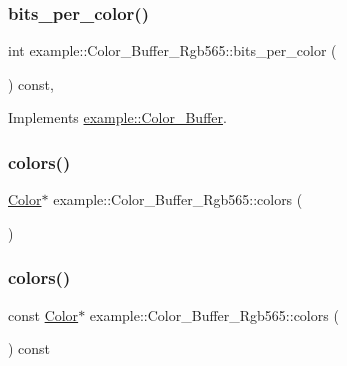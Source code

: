 \subsubsection{\texorpdfstring{bits\_per\_color()}{bits\_per\_color()}}
{\footnotesize\ttfamily int example\+::\+Color\+\_\+\+Buffer\+\_\+\+Rgb565\+::bits\+\_\+per\+\_\+color (\begin{DoxyParamCaption}{ }\end{DoxyParamCaption}) const\hspace{0.3cm}{\ttfamily [inline]}, {\ttfamily [virtual]}}



Implements \mbox{\hyperlink{classexample_1_1_color___buffer_a76463553dc782f2dc24a61bec708e273}{example\+::\+Color\+\_\+\+Buffer}}.

\mbox{\label{classexample_1_1_color___buffer___rgb565_a30c98c79fa4b0fc07d031a70b11ede8b}} 
\subsubsection{\texorpdfstring{colors()}{colors()}\hspace{0.1cm}{\footnotesize\ttfamily [1/2]}}
{\footnotesize\ttfamily \mbox{\hyperlink{structexample_1_1_color___buffer___rgb565_1_1_color}{Color}}$\ast$ example\+::\+Color\+\_\+\+Buffer\+\_\+\+Rgb565\+::colors (\begin{DoxyParamCaption}{ }\end{DoxyParamCaption})\hspace{0.3cm}{\ttfamily [inline]}}

\mbox{\label{classexample_1_1_color___buffer___rgb565_a6b70754a098cda8d093f790d6a0f7386}} 
\subsubsection{\texorpdfstring{colors()}{colors()}\hspace{0.1cm}{\footnotesize\ttfamily [2/2]}}
{\footnotesize\ttfamily const \mbox{\hyperlink{structexample_1_1_color___buffer___rgb565_1_1_color}{Color}}$\ast$ example\+::\+Color\+\_\+\+Buffer\+\_\+\+Rgb565\+::colors (\begin{DoxyParamCaption}{ }\end{DoxyParamCaption}) const\hspace{0.3cm}{\ttfamily [inline]}}

